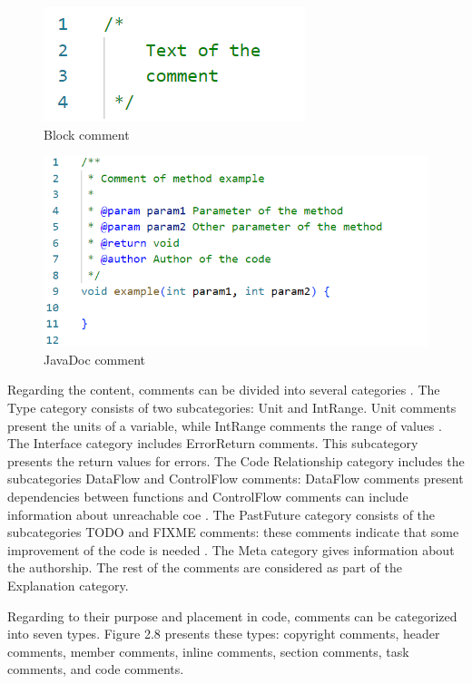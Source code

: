 \begin{figure} [H]
  \centering
  \includegraphics [scale=1]
  {figures/multiline.png}
  \caption{Block comment
  \cite{de2011comment}}
  \label{fig:AnhangsChor}
\end{figure}

\begin{figure} [H]
  \centering
  \includegraphics [scale=0.9]
  {figures/javad.png}
  \caption{JavaDoc comment
  \cite{de2011comment}}
  \label{fig:AnhangsChor}
\end{figure}

Regarding the content, comments can be divided into several categories \cite{de2011comment}. The Type category consists of two subcategories: Unit and IntRange. Unit comments present the units of a variable, while IntRange comments the range of values \cite{de2011comment}.
The Interface category includes ErrorReturn comments. This subcategory presents the return values for errors. 
The Code Relationship category includes the subcategories DataFlow and ControlFlow comments: DataFlow comments present dependencies between functions and ControlFlow comments can include information about unreachable coe \cite{de2011comment}.
The PastFuture category consists of the subcategories TODO and FIXME comments: these comments indicate that some improvement of the code is needed \cite{de2011comment}.
The Meta category gives information about the authorship. The rest of the comments are considered as part of the Explanation category.


Regarding to their purpose and placement in code, comments can be categorized into seven types.  Figure 2.8 presents these types: copyright comments, header comments, member comments, inline comments, section comments, task comments, and code comments. 

